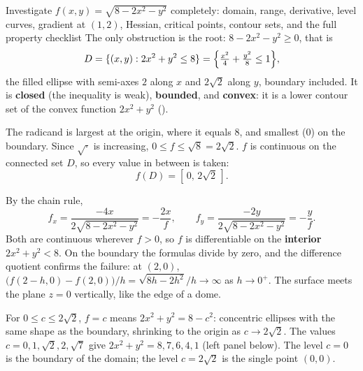 \begin{worked}{Investigate $f(x,y)=\sqrt{8-2x^{2}-y^{2}}$ completely: domain, range, derivative, level curves, gradient at $(1,2)$, Hessian, critical points, contour sets, and the full property checklist}
The only obstruction is the root: $8-2x^{2}-y^{2}\ge0$, that is
\[
  D=\{(x,y): 2x^{2}+y^{2}\le8\}
   =\Bigl\{\tfrac{x^{2}}{4}+\tfrac{y^{2}}{8}\le1\Bigr\},
\]
the filled ellipse with semi-axes $2$ along $x$ and $2\sqrt2$ along $y$,
boundary included. It is \textbf{closed} (the inequality is weak),
\textbf{bounded}, and \textbf{convex}: it is a lower contour set of the
convex function $2x^{2}+y^{2}$ ().

The radicand is largest at the origin, where it equals $8$, and smallest
($0$) on the boundary. Since $\sqrt{\cdot}$ is increasing,
$0\le f\le\sqrt8=2\sqrt2$. $f$ is continuous on the connected set $D$, so
every value in between is taken:
\[
  f(D)=[\,0,\,2\sqrt2\,].
\]

By the chain rule,
\[
  f_{x}=\frac{-4x}{2\sqrt{8-2x^{2}-y^{2}}}=-\frac{2x}{f},\qquad
  f_{y}=\frac{-2y}{2\sqrt{8-2x^{2}-y^{2}}}=-\frac{y}{f}.
\]
Both are continuous wherever $f>0$, so $f$ is differentiable on the
\textbf{interior} $2x^{2}+y^{2}<8$. On the boundary the formulas divide by
zero, and the difference quotient confirms the failure: at $(2,0)$,
$\bigl(f(2-h,0)-f(2,0)\bigr)/h=\sqrt{8h-2h^{2}}/h\to\infty$ as
$h\to0^{+}$. The surface meets the plane $z=0$ vertically, like the edge
of a dome.

For $0\le c\le2\sqrt2$, $f=c$ means $2x^{2}+y^{2}=8-c^{2}$: concentric
ellipses with the same shape as the boundary, shrinking to the origin as
$c\to2\sqrt2$. The values $c=0,1,\sqrt2,2,\sqrt7$ give
$2x^{2}+y^{2}=8,7,6,4,1$ (left panel below). The level $c=0$ is the
boundary of the domain; the level $c=2\sqrt2$ is the single point
$(0,0)$.


\end{worked}
